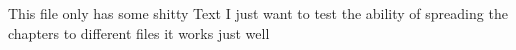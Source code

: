 This file only has some shitty Text
I just want to test the ability of spreading the chapters to different files
it works just well\cite{popp2012}